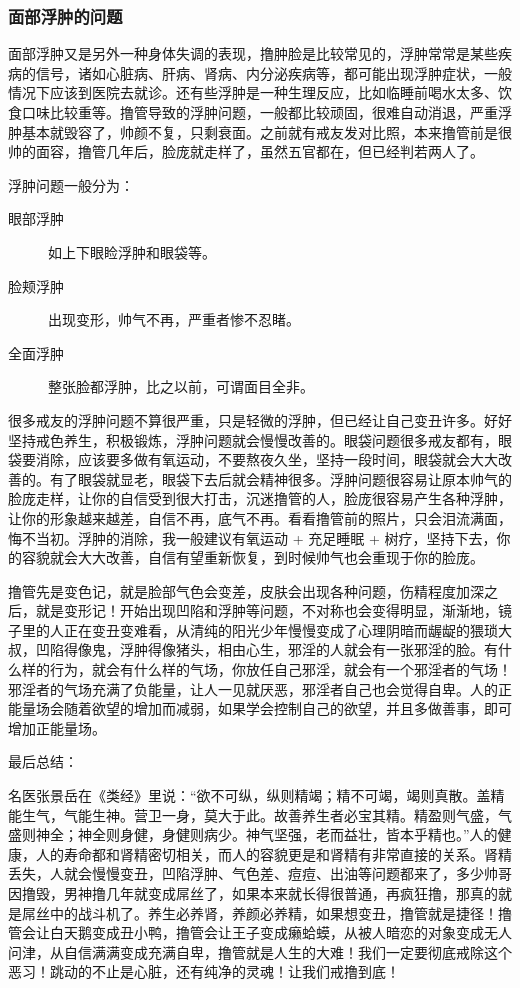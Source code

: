 \subsubsection{面部浮肿的问题}

面部浮肿又是另外一种身体失调的表现，撸肿脸是比较常见的，浮肿常常是某些疾病的信号，诸如心脏病、肝病、肾病、内分泌疾病等，都可能出现浮肿症状，一般情况下应该到医院去就诊。还有些浮肿是一种生理反应，比如临睡前喝水太多、饮食口味比较重等。撸管导致的浮肿问题，一般都比较顽固，很难自动消退，严重浮肿基本就毁容了，帅颜不复，只剩衰面。之前就有戒友发对比照，本来撸管前是很帅的面容，撸管几年后，脸庞就走样了，虽然五官都在，但已经判若两人了。

浮肿问题一般分为：

\begin{description}
    \item[眼部浮肿] 如上下眼睑浮肿和眼袋等。
    \item[脸颊浮肿] 出现变形，帅气不再，严重者惨不忍睹。
    \item[全面浮肿] 整张脸都浮肿，比之以前，可谓面目全非。
\end{description}

很多戒友的浮肿问题不算很严重，只是轻微的浮肿，但已经让自己变丑许多。好好坚持戒色养生，积极锻炼，浮肿问题就会慢慢改善的。眼袋问题很多戒友都有，眼袋要消除，应该要多做有氧运动，不要熬夜久坐，坚持一段时间，眼袋就会大大改善的。有了眼袋就显老，眼袋下去后就会精神很多。浮肿问题很容易让原本帅气的脸庞走样，让你的自信受到很大打击，沉迷撸管的人，脸庞很容易产生各种浮肿，让你的形象越来越差，自信不再，底气不再。看看撸管前的照片，只会泪流满面，悔不当初。浮肿的消除，我一般建议有氧运动 + 充足睡眠 + 树疗，坚持下去，你的容貌就会大大改善，自信有望重新恢复，到时候帅气也会重现于你的脸庞。

撸管先是变色记，就是脸部气色会变差，皮肤会出现各种问题，伤精程度加深之后，就是变形记！开始出现凹陷和浮肿等问题，不对称也会变得明显，渐渐地，镜子里的人正在变丑变难看，从清纯的阳光少年慢慢变成了心理阴暗而龌龊的猥琐大叔，凹陷得像鬼，浮肿得像猪头，相由心生，邪淫的人就会有一张邪淫的脸。有什么样的行为，就会有什么样的气场，你放任自己邪淫，就会有一个邪淫者的气场！邪淫者的气场充满了负能量，让人一见就厌恶，邪淫者自己也会觉得自卑。人的正能量场会随着欲望的增加而减弱，如果学会控制自己的欲望，并且多做善事，即可增加正能量场。

最后总结：

名医张景岳在《类经》里说：“欲不可纵，纵则精竭；精不可竭，竭则真散。盖精能生气，气能生神。营卫一身，莫大于此。故善养生者必宝其精。精盈则气盛，气盛则神全；神全则身健，身健则病少。神气坚强，老而益壮，皆本乎精也。”人的健康，人的寿命都和肾精密切相关，而人的容貌更是和肾精有非常直接的关系。肾精丢失，人就会慢慢变丑，凹陷浮肿、气色差、痘痘、出油等问题都来了，多少帅哥因撸毁，男神撸几年就变成屌丝了，如果本来就长得很普通，再疯狂撸，那真的就是屌丝中的战斗机了。养生必养肾，养颜必养精，如果想变丑，撸管就是捷径！撸管会让白天鹅变成丑小鸭，撸管会让王子变成癞蛤蟆，从被人暗恋的对象变成无人问津，从自信满满变成充满自卑，撸管就是人生的大难！我们一定要彻底戒除这个恶习！跳动的不止是心脏，还有纯净的灵魂！让我们戒撸到底！
